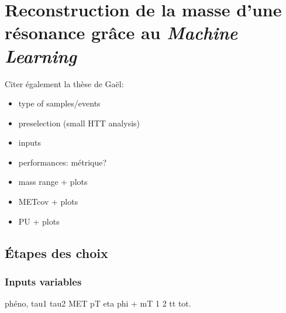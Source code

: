 \chapter{Reconstruction de la masse d'une résonance grâce au \emph{Machine Learning}}\label{chapter-ML}



Citer également la thèse de Gaël:\\

\begin{itemize}
\item type of samples/events
\item preselection (small HTT analysis)
\item inputs
\item performances: métrique?
\item mass range + plots
\item METcov + plots
\item PU + plots
\end{itemize}

\section*{Étapes des choix}
\subsection*{Inputs variables}
phéno, tau1 tau2 MET pT eta phi + mT 1 2 tt tot.
